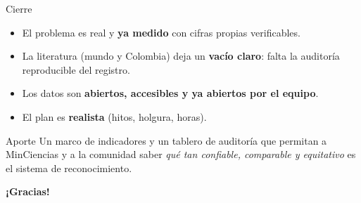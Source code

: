 \documentclass[10pt,aspectratio=169]{beamer}
\begin{document}
\begin{frame}{Cierre}
\begin{itemize}
  \item El problema es real y \textbf{ya medido} con cifras propias verificables.
  \item La literatura (mundo y Colombia) deja un \textbf{vacío claro}: falta la auditoría reproducible del registro.
  \item Los datos son \textbf{abiertos, accesibles y ya abiertos por el equipo}.
  \item El plan es \textbf{realista} (hitos, holgura, horas).
\end{itemize}
\vspace{4mm}
\begin{block}{Aporte}
Un marco de indicadores y un tablero de auditoría que permitan a MinCiencias y a la comunidad saber \emph{qué tan confiable, comparable y equitativo} es el sistema de reconocimiento.
\end{block}
\vspace{3mm}
\begin{center}\large\textbf{¡Gracias!}\end{center}
\end{frame}
\end{document}
